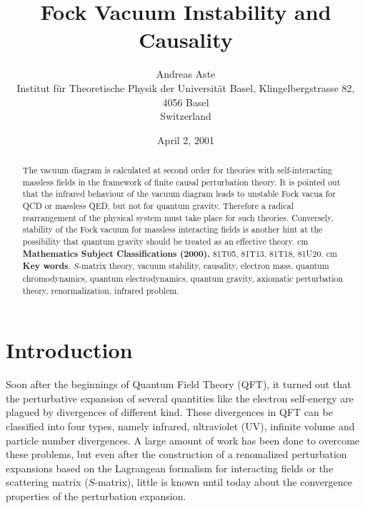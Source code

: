 \documentclass[a4paper,11pt]{article}
\begin{document}
\title{Fock Vacuum Instability and Causality}

\author{Andreas Aste\\ 
Institut f\"ur Theoretische Physik der Universit\"at Basel,
Klingelbergstrasse 82, 4056 Basel\\
Switzerland}
\date{April 2, 2001}

\maketitle
 

\begin{abstract}
The vacuum diagram is calculated at second order for
theories with self-interacting massless fields
in the framework of finite causal perturbation theory. It is
pointed out that the infrared behaviour of the vacuum diagram leads
to unstable Fock vacua for QCD or massless QED, but not for
quantum gravity.
Therefore a radical rearrangement of the physical system
must take place for such theories. Conversely, stability of the
Fock vacuum for massless interacting fields
is another hint at the possibility that
quantum gravity should be treated as an effective theory.
 cm
{\bf Mathematics Subject Classifications (2000).}
81T05, 81T13, 81T18, 81U20.
 cm
{\bf Key words}. $S$-matrix theory, vacuum stability, causality, electron mass,
quantum chromodynamics, quantum electrodynamics, quantum gravity,
axiomatic perturbation theory, renormalization, infrared problem.
\end{abstract}

\newpage

\section{Introduction}
Soon after the beginnings of Quantum Field Theory (QFT), it turned out that the
perturbative expansion of several quantities like the electron self-energy
are plagued by divergences of different kind. These divergences
in QFT can be classified into four types, namely infrared, ultraviolet (UV),
infinite volume and particle number divergences.
A large amount of work has
been done to overcome these problems, but even after the construction
of a renomalized perturbation expansions based on the Lagrangean formalism
for interacting fields or the scattering matrix
($S$-matrix), little is known until today about the
convergence properties of the perturbation expansion.
\end{document}

